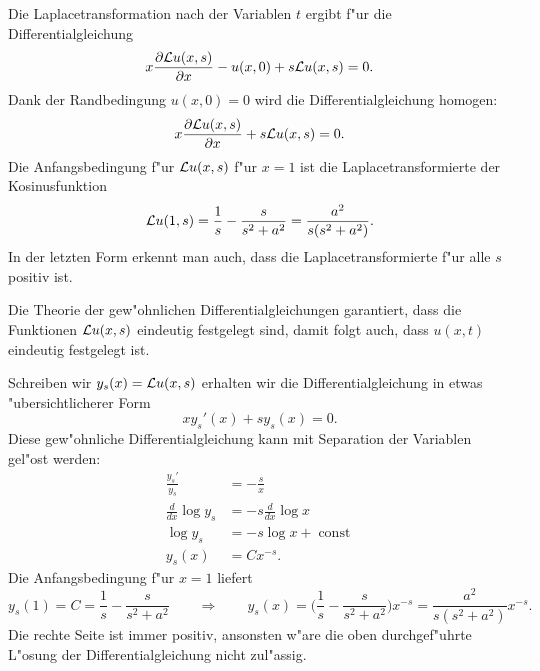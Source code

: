 \begin{loesung}
\begin{teilaufgaben}
\item
Die Laplacetransformation nach der Variablen $t$
ergibt f"ur die Differentialgleichung
\[
x\frac{\partial{\cal L}u(x,s)}{\partial x}
-
u(x,0)+s{\cal L}u(x,s)=0.
\]
Dank der Randbedingung $u(x,0)=0$ wird die Differentialgleichung
homogen:
\[
x\frac{\partial{\cal L}u(x,s)}{\partial x}
+
s{\cal L}u(x,s)=0.
\]
Die Anfangsbedingung f"ur ${\cal L}u(x,s)$ f"ur $x=1$ ist die
Laplacetransformierte der Kosinusfunktion
\[
{\cal L}u(1,s)=\frac1s-\frac{s}{s^2+a^2} = \frac{a^2}{s(s^2+a^2)}.
\]
In der letzten Form erkennt man auch, dass die Laplacetransformierte
f"ur alle $s$ positiv ist.
\item
Die Theorie der gew"ohnlichen Differentialgleichungen garantiert, dass
die Funktionen ${\cal L}u(x,s)$ eindeutig festgelegt sind, damit folgt
auch, dass $u(x,t)$ eindeutig festgelegt ist.
\item
Schreiben wir $y_s(x)={\cal L}u(x,s)$ erhalten wir die Differentialgleichung
in etwas "ubersichtlicherer Form
\begin{equation}
xy_s'(x)+sy_s(x)=0.
\label{50000008:sdgl}
\end{equation}
Diese gew"ohnliche Differentialgleichung kann mit Separation der
Variablen gel"ost werden:
\begin{align*}
\frac{y_s'}{y_s}&=-\frac{s}{x}
\\
\frac{d}{dx}\log y_s&=-s\frac{d}{dx}\log x
\\
\log y_s&=-s\log x+\operatorname{const}
\\
y_s(x)&=Cx^{-s}.
\end{align*}
Die Anfangsbedingung f"ur $x=1$ liefert
\begin{equation}
y_s(1)=C=\frac1s-\frac{s}{s^2+a^2}
\qquad\Rightarrow\qquad
y_s(x)
=
\biggl(\frac1s-\frac{s}{s^2+a^2}\biggr)x^{-s}
=
\frac{a^2}{s(s^2+a^2)}x^{-s}.
\label{50000008:loesung}
\end{equation}
Die rechte Seite ist immer positiv, ansonsten w"are die oben durchgef"uhrte
L"osung der Differentialgleichung nicht zul"assig.
\qedhere
\end{teilaufgaben}
\end{loesung}

